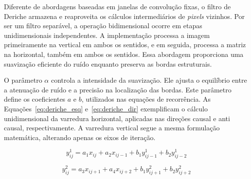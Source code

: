 Diferente de abordagens baseadas em janelas de convolução fixas, o filtro de Deriche armazena e reaproveita os cálculos intermediários de \textit{pixels} vizinhos. Por ser um filtro separável, a operação bidimensional ocorre em etapas unidimensionais independentes. A implementação processa a imagem primeiramente na vertical em ambos os sentidos, e em seguida, processa a matriz na horizontal, também em ambos os sentidos. Essa abordagem proporciona uma suavização eficiente do ruído enquanto preserva as bordas estruturais.

O parâmetro $\alpha$ controla a intensidade da suavização. Ele ajusta o equilíbrio entre a atenuação de ruído e a precisão na localização das bordas. Este parâmetro define os coeficientes $a$ e $b$, utilizados nas equações de recorrência. As Equações~\ref{eq:deriche_esq} e~\ref{eq:deriche_dir} exemplificam o cálculo unidimensional da varredura horizontal, aplicadas nas direções causal e anti causal, respectivamente. A varredura vertical segue a mesma formulação matemática, alterando apenas os eixos de iteração.

\begin{equation}
    \label{eq:deriche_esq}
    y^1_{ij} = a_1x_{ij} + a_2x_{ij - 1} + b_1y^1_{ij - 1} + b_2y^1_{ij - 2}
\end{equation}

\begin{equation}
    \label{eq:deriche_dir}
    y^2_{ij} = a_3x_{ij + 1} + a_4x_{ij + 2} + b_1y^2_{ij + 1} + b_2y^2_{ij + 2}
\end{equation}

